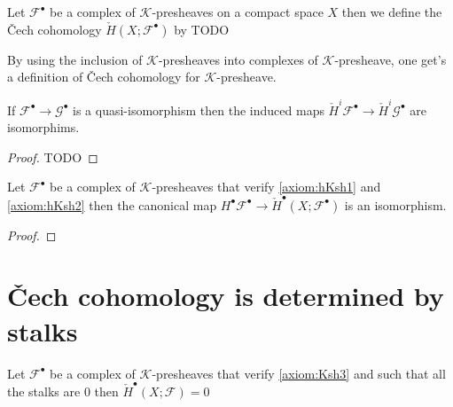 \begin{definition}\label{def:chech_of_compelx_of_k_prsh}
    Let $\mathcal{F}^{\bullet}$ be a complex of $\mathcal{K}$-presheaves on a compact space $X$ then we define the \v{C}ech cohomology $\check{H}(X;\mathcal{F}^{\bullet})$ by TODO
\end{definition}

\begin{remark}\label{def:chech_of_k_prsh}
    By using the inclusion of $\mathcal{K}$-presheaves into complexes of $\mathcal{K}$-presheave, one get's a definition of \v{C}ech cohomology for $\mathcal{K}$-presheave.
\end{remark}

\begin{lemma}\label{lem:chech_preserve_quasi_iso}
    If $\mathcal{F}^{\bullet}\to\mathcal{G}^{\bullet}$ is a quasi-isomorphism then the induced maps $\check{H}^i\mathcal{F}^{\bullet}\to \check{H}^i\mathcal{G}^{\bullet}$ are isomorphims.
\end{lemma}

\begin{proof}
    TODO
\end{proof}

\begin{proposition}\label{prop:homotopy_k_sheaf_compute_chech}
    Let $\mathcal{F}^{\bullet}$ be a complex of $\mathcal{K}$-presheaves that verify \eqref{axiom:hKsh1} and \eqref{axiom:hKsh2} then the canonical map $H^{\bullet}\mathcal{F}^{\bullet}\to \check{H}^{\bullet}(X;\mathcal{F}^{\bullet})$ is an isomorphism.
\end{proposition}

\begin{proof}

\end{proof}

\section{\v{C}ech cohomology is determined by stalks}

\begin{lemma}\label{lem:chech_is_determined_by_stalks_1}
    Let $\mathcal{F}^{\bullet}$ be a complex of $\mathcal{K}$-presheaves that verify \eqref{axiom:Ksh3} and such that all the stalks are $0$ then $\check{H}^{\bullet}(X;\mathcal{F})=0$
    
\end{lemma}

